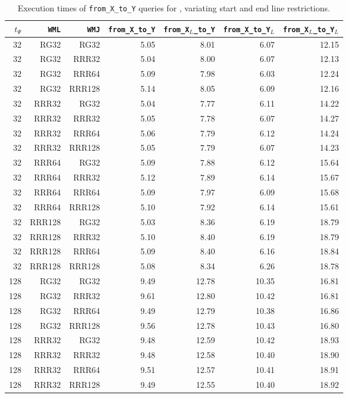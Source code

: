\begin{table}
\caption{Execution times of \texttt{from\_X\_to\_Y} queries for \ctr, variating start and end line restrictions.}
\begin{tabular}{|r|r|r|r|r|r|r|}
\hline
$t_{\Psi}$ & \texttt{WML} & \texttt{WMJ} & \texttt{from\_X\_to\_Y} & \texttt{from\_X$_{L}$\_to\_Y} & \texttt{from\_X\_to\_Y$_{L}$} & \texttt{from\_X$_{L}$\_to\_Y$_{L}$} \\
\hline
32 & RG32 & RG32 & 5.05 & 8.01 & 6.07 & 12.15 \\
32 & RG32 & RRR32 & 5.04 & 8.00 & 6.07 & 12.13 \\
32 & RG32 & RRR64 & 5.09 & 7.98 & 6.03 & 12.24 \\
32 & RG32 & RRR128 & 5.14 & 8.05 & 6.09 & 12.16 \\
32 & RRR32 & RG32 & 5.04 & 7.77 & 6.11 & 14.22 \\
32 & RRR32 & RRR32 & 5.05 & 7.78 & 6.07 & 14.27 \\
32 & RRR32 & RRR64 & 5.06 & 7.79 & 6.12 & 14.24 \\
32 & RRR32 & RRR128 & 5.05 & 7.79 & 6.07 & 14.23 \\
32 & RRR64 & RG32 & 5.09 & 7.88 & 6.12 & 15.64 \\
32 & RRR64 & RRR32 & 5.12 & 7.89 & 6.14 & 15.67 \\
32 & RRR64 & RRR64 & 5.09 & 7.97 & 6.09 & 15.68 \\
32 & RRR64 & RRR128 & 5.10 & 7.92 & 6.14 & 15.61 \\
32 & RRR128 & RG32 & 5.03 & 8.36 & 6.19 & 18.79 \\
32 & RRR128 & RRR32 & 5.10 & 8.40 & 6.19 & 18.79 \\
32 & RRR128 & RRR64 & 5.09 & 8.40 & 6.16 & 18.84 \\
32 & RRR128 & RRR128 & 5.08 & 8.34 & 6.26 & 18.78 \\
128 & RG32 & RG32 & 9.49 & 12.78 & 10.35 & 16.81 \\
128 & RG32 & RRR32 & 9.61 & 12.80 & 10.42 & 16.81 \\
128 & RG32 & RRR64 & 9.49 & 12.79 & 10.38 & 16.86 \\
128 & RG32 & RRR128 & 9.56 & 12.78 & 10.43 & 16.80 \\
128 & RRR32 & RG32 & 9.48 & 12.59 & 10.42 & 18.93 \\
128 & RRR32 & RRR32 & 9.48 & 12.58 & 10.40 & 18.90 \\
128 & RRR32 & RRR64 & 9.51 & 12.57 & 10.41 & 18.91 \\
128 & RRR32 & RRR128 & 9.49 & 12.55 & 10.40 & 18.92 \\

\end{tabular}
\end{table}

